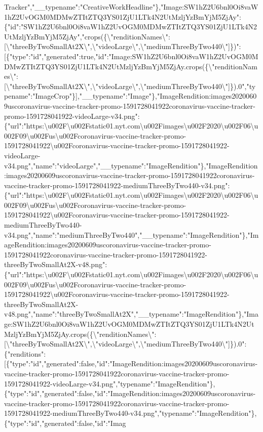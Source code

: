 Tracker","\_\_typename":"CreativeWorkHeadline"\},"Image:SW1hZ2U6bnl0Oi8vaW1hZ2UvOGM0MDMwZTItZTQ3YS01ZjU1LTk4N2UtMzljYzBmYjM5ZjAy":\{"id":"SW1hZ2U6bnl0Oi8vaW1hZ2UvOGM0MDMwZTItZTQ3YS01ZjU1LTk4N2UtMzljYzBmYjM5ZjAy","crops(\{\textbackslash{}"renditionNames\textbackslash{}":{[}\textbackslash{}"threeByTwoSmallAt2X\textbackslash{}",\textbackslash{}"videoLarge\textbackslash{}",\textbackslash{}"mediumThreeByTwo440\textbackslash{}"{]}\})":{[}\{"type":"id","generated":true,"id":"Image:SW1hZ2U6bnl0Oi8vaW1hZ2UvOGM0MDMwZTItZTQ3YS01ZjU1LTk4N2UtMzljYzBmYjM5ZjAy.crops(\{\textbackslash{}"renditionNames\textbackslash{}":{[}\textbackslash{}"threeByTwoSmallAt2X\textbackslash{}",\textbackslash{}"videoLarge\textbackslash{}",\textbackslash{}"mediumThreeByTwo440\textbackslash{}"{]}\}).0","typename":"ImageCrop"\}{]},"\_\_typename":"Image"\},"ImageRendition:images20200609uscoronavirus-vaccine-tracker-promo-1591728041922coronavirus-vaccine-tracker-promo-1591728041922-videoLarge-v34.png":\{"url":"https:\textbackslash{}u002F\textbackslash{}u002Fstatic01.nyt.com\textbackslash{}u002Fimages\textbackslash{}u002F2020\textbackslash{}u002F06\textbackslash{}u002F09\textbackslash{}u002Fus\textbackslash{}u002Fcoronavirus-vaccine-tracker-promo-1591728041922\textbackslash{}u002Fcoronavirus-vaccine-tracker-promo-1591728041922-videoLarge-v34.png","name":"videoLarge","\_\_typename":"ImageRendition"\},"ImageRendition:images20200609uscoronavirus-vaccine-tracker-promo-1591728041922coronavirus-vaccine-tracker-promo-1591728041922-mediumThreeByTwo440-v34.png":\{"url":"https:\textbackslash{}u002F\textbackslash{}u002Fstatic01.nyt.com\textbackslash{}u002Fimages\textbackslash{}u002F2020\textbackslash{}u002F06\textbackslash{}u002F09\textbackslash{}u002Fus\textbackslash{}u002Fcoronavirus-vaccine-tracker-promo-1591728041922\textbackslash{}u002Fcoronavirus-vaccine-tracker-promo-1591728041922-mediumThreeByTwo440-v34.png","name":"mediumThreeByTwo440","\_\_typename":"ImageRendition"\},"ImageRendition:images20200609uscoronavirus-vaccine-tracker-promo-1591728041922coronavirus-vaccine-tracker-promo-1591728041922-threeByTwoSmallAt2X-v48.png":\{"url":"https:\textbackslash{}u002F\textbackslash{}u002Fstatic01.nyt.com\textbackslash{}u002Fimages\textbackslash{}u002F2020\textbackslash{}u002F06\textbackslash{}u002F09\textbackslash{}u002Fus\textbackslash{}u002Fcoronavirus-vaccine-tracker-promo-1591728041922\textbackslash{}u002Fcoronavirus-vaccine-tracker-promo-1591728041922-threeByTwoSmallAt2X-v48.png","name":"threeByTwoSmallAt2X","\_\_typename":"ImageRendition"\},"Image:SW1hZ2U6bnl0Oi8vaW1hZ2UvOGM0MDMwZTItZTQ3YS01ZjU1LTk4N2UtMzljYzBmYjM5ZjAy.crops(\{\textbackslash{}"renditionNames\textbackslash{}":{[}\textbackslash{}"threeByTwoSmallAt2X\textbackslash{}",\textbackslash{}"videoLarge\textbackslash{}",\textbackslash{}"mediumThreeByTwo440\textbackslash{}"{]}\}).0":\{"renditions":{[}\{"type":"id","generated":false,"id":"ImageRendition:images20200609uscoronavirus-vaccine-tracker-promo-1591728041922coronavirus-vaccine-tracker-promo-1591728041922-videoLarge-v34.png","typename":"ImageRendition"\},\{"type":"id","generated":false,"id":"ImageRendition:images20200609uscoronavirus-vaccine-tracker-promo-1591728041922coronavirus-vaccine-tracker-promo-1591728041922-mediumThreeByTwo440-v34.png","typename":"ImageRendition"\},\{"type":"id","generated":false,"id":"Imag